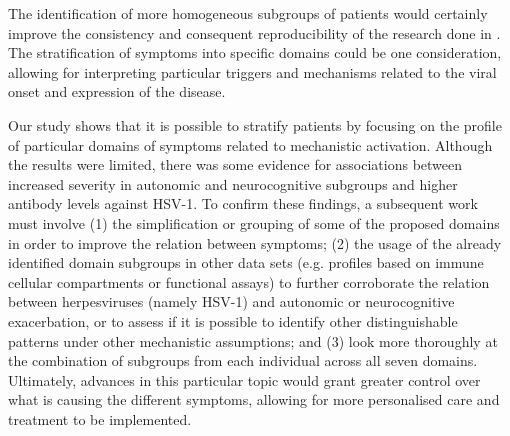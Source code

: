 The identification of more homogeneous subgroups of patients would certainly improve the consistency and consequent reproducibility of the research done in \cfs.
The stratification of symptoms into specific domains could be one consideration, allowing for interpreting particular triggers and mechanisms related to the viral onset and expression of the disease.

Our study shows that it is possible to stratify \cfs patients by focusing on the profile of particular domains of symptoms related to mechanistic activation.
Although the results were limited, there was some evidence for associations between increased severity in autonomic and neurocognitive subgroups and higher antibody levels against HSV-1.
To confirm these findings, a subsequent work must involve (1) the simplification or grouping of some of the proposed domains in order to improve the relation between symptoms; (2) the usage of the already identified domain subgroups in other data sets (e.g. profiles based on immune cellular compartments or functional assays) to further corroborate the relation between herpesviruses (namely HSV-1) and autonomic or neurocognitive exacerbation, or to assess if it is possible to identify other distinguishable patterns under other mechanistic assumptions; and (3) look more thoroughly at the combination of subgroups from each individual across all seven domains.
Ultimately, advances in this particular topic would grant greater control over what is causing the different symptoms, allowing for more personalised care and treatment to be implemented.




